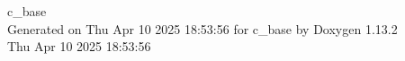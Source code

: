 \documentclass[twoside]{book}
\newcommand{\+}{\discretionary{\mbox{\scriptsize$\hookleftarrow$}}{}{}}
\newcommand{\clearemptydoublepage}{%
    \newpage{\pagestyle{empty}\cleardoublepage}%
  }
\begin{document}
  \raggedbottom
    \hypersetup{pageanchor=false,
                bookmarksnumbered=true,
                pdfencoding=unicode
               }
  \begin{titlepage}
  \vspace*{7cm}
  \begin{center}%
  {\Large c\+\_\+base}\\
  \vspace*{1cm}
  {\large Generated on Thu Apr 10 2025 18\+:53\+:56 for c\+\_\+base by Doxygen 1.13.2}\\
    \vspace*{0.5cm}
    {\small Thu Apr 10 2025 18:53:56}
  \end{center}
  \end{titlepage}
  \clearemptydoublepage
  \tableofcontents
  \clearemptydoublepage
  \hypersetup{pageanchor=true}
  \backmatter
  \newpage
  \clearemptydoublepage
  \printindex
\end{document}
